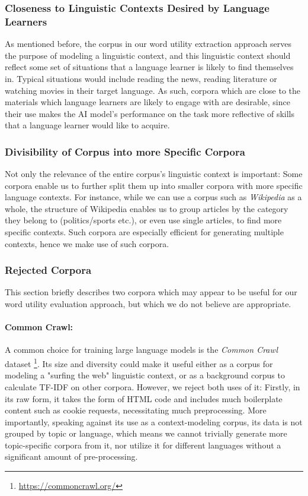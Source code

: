 \subsubsection{Closeness to Linguistic Contexts Desired by Language Learners}
As mentioned before, the corpus in our word utility extraction approach serves the purpose of modeling a linguistic context, and this linguistic context should reflect some set of situations that a language learner is likely to find themselves in.
Typical situations would include reading the news, reading literature or watching movies in their target language.
As such, corpora which are close to the materials which language learners are likely to engage with are desirable, since their use makes the AI model's performance on the task more reflective of skills that a language learner would like to acquire.

\subsubsection{Divisibility of Corpus into more Specific Corpora}
Not only the relevance of the entire corpus's linguistic context is important:
Some corpora enable us to further split them up into smaller corpora with more specific language contexts.
For instance, while we can use a corpus such as \textit{Wikipedia} as a whole, the structure of Wikipedia enables us to group articles by the category they belong to (politics/sports etc.), or even use single articles, to find more specific contexts.
Such corpora are especially efficient for generating multiple contexts, hence we make use of such corpora.


\subsubsection{Rejected Corpora} \label{sec:rejected-corpora}
This section briefly describes two corpora which may appear to be useful for our word utility evaluation approach, but which we do not believe are appropriate.

\paragraph{Common Crawl:}
A common choice for training large language models is the \textit{Common Crawl} dataset \footnote{\url{https://commoncrawl.org/}}.
Its size and diversity could make it useful either as a corpus for modeling a "surfing the web" linguistic context, or as a background corpus to calculate TF-IDF on other corpora.
However, we reject both uses of it:
Firstly, in its raw form, it takes the form of HTML code and includes much boilerplate content such as cookie requests, necessitating much preprocessing.
More importantly, speaking against its use as a context-modeling corpus, its data is not grouped by topic or language, which means we cannot trivially generate more topic-specific corpora from it, nor utilize it for different languages without a significant amount of pre-processing.


